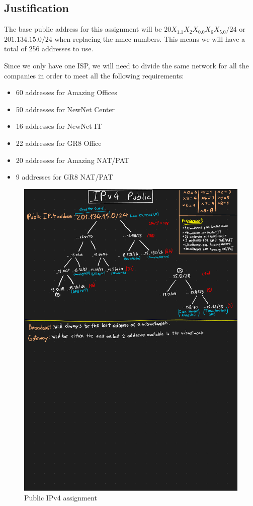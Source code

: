\documentclass{report}
\begin{document}
\subsection*{Justification}

The base public address for this assignment will be $20X_1.1X_2X_0.0X_6X_5.0/24$ or $201.134.15.0/24$ when replacing the nmec numbers. This means we will have a total of 256 addresses to use.

Since we only have one ISP, we will need to divide the same network for all the companies in order to meet all the following requirements:

\begin{itemize}
    \item 60 addresses for Amazing Offices
    \item 50 addresses for NewNet Center
    \item 16 addresses for NewNet IT
    \item 22 addresses for GR8 Office
    \item 20 addresses for Amazing NAT/PAT
    \item 9 addresses for GR8 NAT/PAT
\end{itemize}

\begin{figure}
    \centering
    \includegraphics[width=\textwidth,trim={0 14cm 0 0},clip]{public-ipv4}
    \caption{Public IPv4 assignment}
    \label{fig:public-ipv4}
\end{figure}
\end{document}
